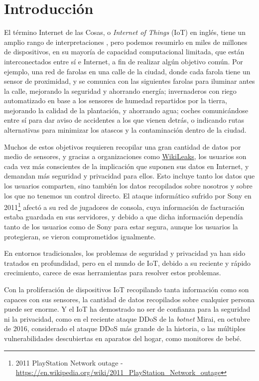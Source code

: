 \chapter*{Introducción}\label{ch:introduccion}

El término Internet de las Cosas, o \textit{Internet of Things} (IoT) en inglés, tiene un amplio rango de interpretaciones \citep{Atzori20102787}, pero podemos resumirlo en miles de millones de dispositivos, en su mayoría de capacidad computacional limitada, que están interconectados entre sí e Internet, a fin de realizar algún objetivo común. Por ejemplo, una red de farolas en una calle de la ciudad, donde cada farola tiene un sensor de proximidad, y se comunica con las siguientes farolas para iluminar antes la calle, mejorando la seguridad y ahorrando energía; invernaderos con riego automatizado en base a los sensores de humedad repartidos por la tierra, mejorando la calidad de la plantación, y ahorrando agua; coches comunicándose entre sí para dar aviso de accidentes a los que vienen detrás, o indicando rutas alternativas para minimizar los atascos y la contaminación dentro de la ciudad. 


Muchos de estos objetivos requieren recopilar una gran cantidad de datos por medio de sensores, y gracias a organizaciones como \href{https://wikileaks.org/}{WikiLeaks}, los usuarios son cada vez más conscientes de la implicación que suponen sus datos en Internet, y demandan más seguridad y privacidad para ellos. Esto incluye tanto los datos que los usuarios comparten, sino también los datos recopilados sobre nosotros y sobre los que no tenemos un control directo. El ataque informático sufrido por Sony en 2011\footnote{2011 PlayStation Network outage - 
\url{https://en.wikipedia.org/wiki/2011_PlayStation_Network_outage}} afectó a su red de jugadores de consola, cuya información de facturación estaba guardada en sus servidores, y debido a que dicha información dependía tanto de los usuarios como de Sony para estar segura, aunque los usuarios la protegieran, se vieron comprometidos igualmente.


En entornos tradicionales, los problemas de seguridad y privacidad ya han sido tratados en profundidad, pero en el mundo de IoT, debido a su reciente y rápido crecimiento, carece de esas herramientas para resolver estos problemas.

Con la proliferación de dispositivos IoT recopilando tanta información como son capaces con sus sensores, la cantidad de datos recopilados sobre cualquier persona puede ser enorme. Y el IoT ha demostrado no ser de confianza para la seguridad ni la privacidad, como en el reciente ataque DDoS de la \textit{botnet} Mirai, en octubre de 2016, considerado el ataque DDoS más grande de la historia\citep{jeyanthi:2017}, o las múltiples vulnerabilidades descubiertas en aparatos del hogar, como monitores de bebé\citep{rapid7babycam}.


